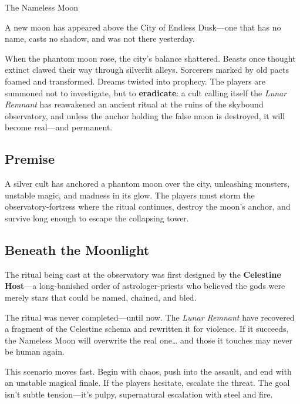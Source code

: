 \begin{WyrdScenarioHeading}{The Nameless Moon}
	\label{scenario:the-nameless-moon}
	
	A new moon has appeared above the City of Endless Dusk—one that has no name, casts no shadow, and was not there yesterday.

	When the phantom moon rose, the city's balance shattered. Beasts once thought extinct clawed their way through silverlit alleys. Sorcerers marked by old pacts foamed and transformed. Dreams twisted into prophecy. The players are summoned not to investigate, but to \textbf{eradicate}: a cult calling itself the \emph{Lunar Remnant} has reawakened an ancient ritual at the ruins of the skybound observatory, and unless the anchor holding the false moon is destroyed, it will become real—and permanent.

	\subsection*{Premise} 
	A silver cult has anchored a phantom moon over the city, unleashing monsters, unstable magic, and madness in its glow. The players must storm the observatory-fortress where the ritual continues, destroy the moon’s anchor, and survive long enough to escape the collapsing tower.

	\subsection*{Beneath the Moonlight}
	The ritual being cast at the observatory was first designed by the \textbf{Celestine Host}—a long-banished order of astrologer-priests who believed the gods were merely stars that could be named, chained, and bled.

	The ritual was never completed—until now. The \emph{Lunar Remnant} have recovered a fragment of the Celestine schema and rewritten it for violence. If it succeeds, the Nameless Moon will overwrite the real one… and those it touches may never be human again.
\end{WyrdScenarioHeading}


\begin{GmTips}
	This scenario moves fast. Begin with chaos, push into the assault, and end with an unstable magical finale. If the players hesitate, escalate the threat. The goal isn’t subtle tension—it’s pulpy, supernatural escalation with steel and fire.
\end{GmTips}

